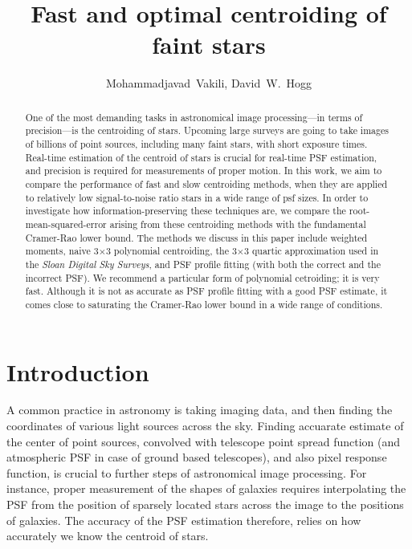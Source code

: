 \documentclass[12pt, preprint]{aastex}
\begin{document}
\author{
  Mohammadjavad~Vakili,
  David~W.~Hogg
}

\title{Fast and optimal centroiding of faint stars}

\begin{abstract}
One of the most demanding tasks in astronomical image processing---in terms of precision---is the centroiding of stars. 
Upcoming large surveys are going to take images of billions of point sources, 
including many faint stars, with short exposure times. Real-time estimation of the
centroid of stars is crucial for real-time PSF estimation, and precision is required
for measurements of proper motion. In this work, we aim to compare the performance of
fast and slow centroiding methods, when they are applied
to relatively low signal-to-noise ratio stars in a wide range of psf sizes.
In order to investigate how information-preserving these techniques are, we compare
the root-mean-squared-error arising from these centroiding methods with the fundamental Cramer-Rao
lower bound. The methods we discuss in this paper include weighted moments, naive 3$\times$3 polynomial centroiding,
the 3$\times$3 quartic approximation used in the \textsl{Sloan Digital Sky Surveys}, and PSF profile fitting
(with both the correct and the incorrect PSF).
We recommend a particular form of polynomial cetroiding; it is very fast.
Although it is not as accurate as PSF profile fitting with a good PSF estimate,
it comes close to saturating the Cramer-Rao lower bound in a wide range of conditions.
\end{abstract}

\section{Introduction}

A common practice in astronomy is taking imaging data, and then finding the coordinates
of various light sources across the sky. Finding accuarate estimate of the center of point
sources, convolved with telescope point spread function (and atmospheric PSF in case of
ground based telescopes), and also pixel response function, is crucial to further steps of
astronomical image processing. For instance, proper measurement of the shapes of galaxies
requires interpolating the PSF from the position of sparsely located stars across the
image to the positions of galaxies. The accuracy of the PSF estimation therefore,
relies on how accurately we know the centroid of stars. 
\end{document}
